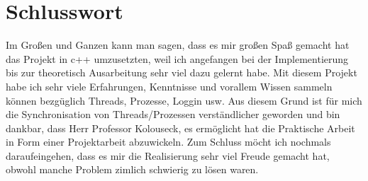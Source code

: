 \documentclass[a4paper,12pt]{article}
\begin{document}
\section{Schlusswort}
Im Großen und Ganzen kann man sagen, dass es mir großen Spaß gemacht hat das Projekt in c++ umzusetzten, weil ich angefangen bei der Implementierung bis zur theoretisch Ausarbeitung
sehr viel dazu gelernt habe. Mit diesem Projekt habe ich sehr viele Erfahrungen, Kenntnisse und vorallem Wissen sammeln können bezgüglich Threads, Prozesse, Loggin usw.
Aus diesem Grund ist für mich die Synchronisation von Threads/Prozessen verständlicher geworden und bin dankbar, dass Herr Professor Kolouseck, es ermöglicht hat die Praktische Arbeit
in Form einer Projektarbeit abzuwickeln. Zum Schluss möcht ich nochmals daraufeingehen, dass es mir die Realisierung sehr viel Freude gemacht hat, obwohl manche Problem zimlich schwierig zu lösen waren.
\end{document}
